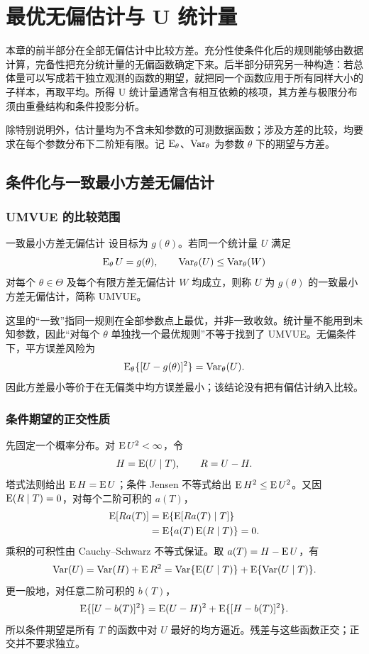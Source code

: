 \chapter{最优无偏估计与 U 统计量}

本章的前半部分在全部无偏估计中比较方差。充分性使条件化后的规则能够由数据计算，完备性把充分统计量的无偏函数确定下来。后半部分研究另一种构造：若总体量可以写成若干独立观测的函数的期望，就把同一个函数应用于所有同样大小的子样本，再取平均。所得 U 统计量通常含有相互依赖的核项，其方差与极限分布须由重叠结构和条件投影分析。

除特别说明外，估计量均为不含未知参数的可测数据函数；涉及方差的比较，均要求在每个参数分布下二阶矩有限。记 $\operatorname{E}_\theta$、$\operatorname{Var}_\theta$ 为参数 $\theta$ 下的期望与方差。

\section{条件化与一致最小方差无偏估计}

\subsection{UMVUE 的比较范围}

\begin{definitionbox}{一致最小方差无偏估计}
设目标为 $g(\theta)$。若同一个统计量 $U$ 满足
\[
 \operatorname{E}_\theta U=g(\theta),\qquad
 \operatorname{Var}_\theta(U)\leq\operatorname{Var}_\theta(W)
\]
对每个 $\theta\in\Theta$ 及每个有限方差无偏估计 $W$ 均成立，则称 $U$ 为 $g(\theta)$ 的一致最小方差无偏估计，简称 UMVUE。
\end{definitionbox}

这里的“一致”指同一规则在全部参数点上最优，并非一致收敛。统计量不能用到未知参数，因此“对每个 $\theta$ 单独找一个最优规则”不等于找到了 UMVUE。无偏条件下，平方误差风险为
\[
 \operatorname{E}_\theta\{[U-g(\theta)]^2\}=\operatorname{Var}_\theta(U).
\]
因此方差最小等价于在无偏类中均方误差最小；该结论没有把有偏估计纳入比较。

\subsection{条件期望的正交性质}

先固定一个概率分布。对 $\operatorname{E} U^2<\infty$，令
\[
 H=\operatorname{E}(U\mid T),\qquad R=U-H.
\]
塔式法则给出 $\operatorname{E} H=\operatorname{E} U$；条件 Jensen 不等式给出 $\operatorname{E} H^2\leq\operatorname{E} U^2$。又因 $\operatorname{E}(R\mid T)=0$，对每个二阶可积的 $a(T)$，
\begin{align*}
 \operatorname{E}[Ra(T)]
 &=\operatorname{E}\{\operatorname{E}[Ra(T)\mid T]\}\\
 &=\operatorname{E}\{a(T)\operatorname{E}(R\mid T)\}=0.
\end{align*}
乘积的可积性由 Cauchy--Schwarz 不等式保证。取 $a(T)=H-\operatorname{E} U$，有
\begin{equation}
 \operatorname{Var}(U)=\operatorname{Var}(H)+\operatorname{E} R^2
 =\operatorname{Var}\{\operatorname{E}(U\mid T)\}+\operatorname{E}\{\operatorname{Var}(U\mid T)\}.
 \label{eq:ch4-total-var}
\end{equation}
更一般地，对任意二阶可积的 $b(T)$，
\[
 \operatorname{E}\{[U-b(T)]^2\}=\operatorname{E}(U-H)^2+\operatorname{E}\{[H-b(T)]^2\}.
\]
所以条件期望是所有 $T$ 的函数中对 $U$ 最好的均方逼近。残差与这些函数正交；正交并不要求独立。

